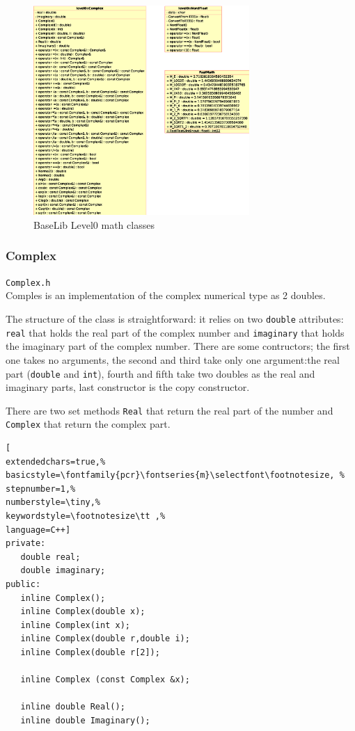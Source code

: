 \begin{figure}[h!]
 \begin{center}
  \includegraphics[width=0.73\textwidth]{level0/level0-math.eps}
  \caption{BaseLib Level0 math classes}
  \label{f:level0:math}
 \end{center}
\end{figure}



\subsubsection{Complex}
\texttt{Complex.h}\\

Comples is an implementation of the complex numerical type as 2 doubles.

The structure of the class is straightforward: it relies on two \texttt{double} attributes: \texttt{real} that holds the real part of the complex number and \texttt{imaginary} that holds the imaginary part of the complex number. There are some contructors; the first one takes no arguments, the second and third take only one argument:the real part (\texttt{double} and \texttt{int}), fourth and fifth take two doubles as the real and imaginary parts, last constructor is the copy constructor. 

There are two set methods \texttt{Real} that return the real part of the number and \texttt{Complex} that return the complex part.

\begin{lstlisting}[
extendedchars=true,%
basicstyle=\fontfamily{pcr}\fontseries{m}\selectfont\footnotesize, %
stepnumber=1,%
numberstyle=\tiny,%
keywordstyle=\footnotesize\tt ,%
language=C++]
private:
   double real;
   double imaginary;
public:
   inline Complex();
   inline Complex(double x);
   inline Complex(int x);
   inline Complex(double r,double i);
   inline Complex(double r[2]);

   inline Complex (const Complex &x);

   inline double Real();
   inline double Imaginary();
\end{lstlisting}

